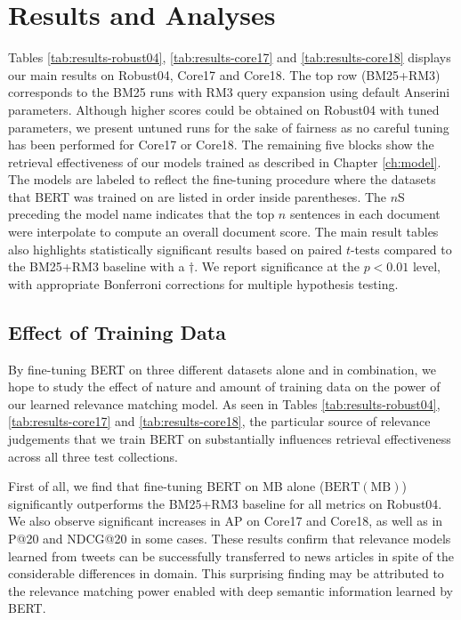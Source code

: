 \section{Results and Analyses}

Tables \ref{tab:results-robust04}, \ref{tab:results-core17} and \ref{tab:results-core18} displays our main results on Robust04, Core17 and Core18.
The top row (BM25+RM3) corresponds to the BM25 runs with RM3 query expansion using default Anserini parameters.
Although higher scores could be obtained on Robust04 with tuned parameters, we present untuned runs for the sake of fairness as no careful tuning has been performed for Core17 or Core18.
The remaining five blocks show the retrieval effectiveness of our models trained as described in Chapter \ref{ch:model}.
The models are labeled to reflect the fine-tuning procedure where the datasets that BERT was trained on are listed in order inside parentheses.
The $ n $S preceding the model name indicates that the top $ n $ sentences in each document were interpolate to compute an overall document score.
The main result tables also highlights statistically significant results based on paired $ t $-tests compared to the BM25+RM3 baseline with a $ {\dagger} $.
We report significance at the $ p < 0.0 1 $ level, with appropriate Bonferroni corrections for multiple hypothesis testing.

\subsection{Effect of Training Data}

By fine-tuning BERT on three different datasets alone and in combination, we hope to study the effect of nature and amount of training data on the power of our learned relevance matching model.
As seen in Tables \ref{tab:results-robust04}, \ref{tab:results-core17} and \ref{tab:results-core18}, the particular source of relevance judgements that we train BERT on substantially influences retrieval effectiveness across all three test collections.

First of all, we find that fine-tuning BERT on MB alone ($ \textrm{BERT}(\textrm{MB}) $) significantly outperforms the BM25+RM3 baseline for all metrics on Robust04.
We also observe significant increases in AP on Core17 and Core18, as well as in P@20 and NDCG@20 in some cases.
These results confirm that relevance models learned from tweets can be successfully transferred to news articles in spite of the considerable differences in domain.
This surprising finding may be attributed to the relevance matching power enabled with deep semantic information learned by BERT.

